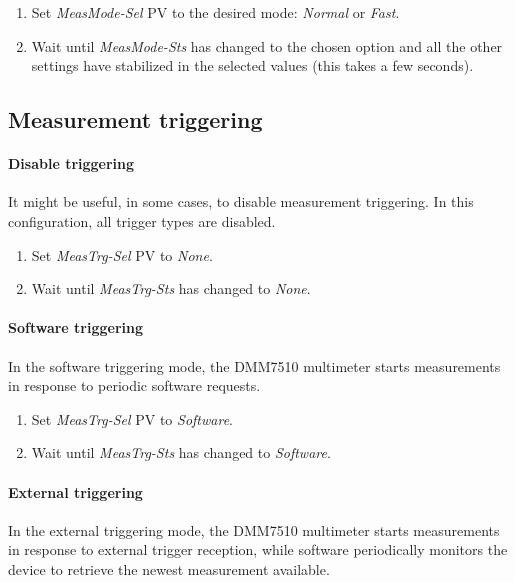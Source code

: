 \documentclass[openany]{article}
\begin{document}
	\bigskip
	\noindent{}

			\begin{enumerate}
				\item Set \emph{MeasMode-Sel} PV to the desired mode: \emph{Normal} or \emph{Fast}.
				\item Wait until \emph{MeasMode-Sts} has changed to the chosen option and all the other settings have stabilized in the selected values (this takes a few seconds).
			\end{enumerate}

	\subsection{Measurement triggering}

		\paragraph{Disable triggering}\label{disable-triggering} It might be useful, in some cases, to disable measurement triggering. In this configuration, all trigger types are disabled.

			\begin{enumerate}
				\item Set \emph{MeasTrg-Sel} PV to \emph{None}.
				\item Wait until \emph{MeasTrg-Sts} has changed to \emph{None}.
			\end{enumerate}

		\paragraph{Software triggering} In the software triggering mode, the DMM7510 multimeter starts measurements in response to periodic software requests.

			\begin{enumerate}
				\item Set \emph{MeasTrg-Sel} PV to \emph{Software}.
				\item Wait until \emph{MeasTrg-Sts} has changed to \emph{Software}.
			\end{enumerate}

		\paragraph{External triggering} In the external triggering mode, the DMM7510 multimeter starts measurements in response to external trigger reception, while software periodically monitors the device to retrieve the newest measurement available.
\end{document}
